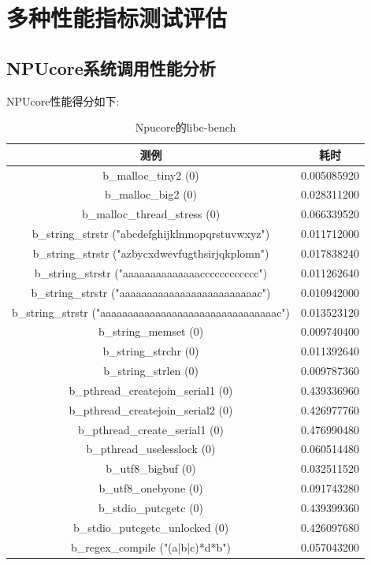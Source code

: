 \section{多种性能指标测试评估}

\subsection{NPUcore系统调用性能分析}

NPUcore性能得分如下:

\begin{table}
    \centering
    \begin{tabular}{|c|c|}
        \hline
        测例 & 耗时 \\
        \hline
        b\_malloc\_tiny2 (0) & 0.005085920 \\
        \hline
        b\_malloc\_big2 (0) & 0.028311200 \\
        \hline
        b\_malloc\_thread\_stress (0) & 0.066339520 \\
        \hline
        b\_string\_strstr ("abcdefghijklmnopqrstuvwxyz") & 0.011712000 \\
        \hline
        b\_string\_strstr ("azbycxdwevfugthsirjqkplomn") & 0.017838240 \\
        \hline
        b\_string\_strstr ("aaaaaaaaaaaaaacccccccccccc") & 0.011262640 \\
        \hline
        b\_string\_strstr ("aaaaaaaaaaaaaaaaaaaaaaaaac") & 0.010942000 \\
        \hline
        b\_string\_strstr ("aaaaaaaaaaaaaaaaaaaaaaaaaaaaaaaac") & 0.013523120 \\
        \hline
        b\_string\_memset (0) & 0.009740400 \\
        \hline
        b\_string\_strchr (0) & 0.011392640 \\
        \hline
        b\_string\_strlen (0) & 0.009787360 \\
        \hline
        b\_pthread\_createjoin\_serial1 (0) & 0.439336960 \\
        \hline
        b\_pthread\_createjoin\_serial2 (0) & 0.426977760 \\
        \hline
        b\_pthread\_create\_serial1 (0) & 0.476990480 \\
        \hline
        b\_pthread\_uselesslock (0) & 0.060514480 \\
        \hline
        b\_utf8\_bigbuf (0) & 0.032511520 \\
        \hline
        b\_utf8\_onebyone (0) & 0.091743280 \\
        \hline
        b\_stdio\_putcgetc (0) & 0.439399360 \\
        \hline
        b\_stdio\_putcgetc\_unlocked (0) & 0.426097680 \\
        \hline
        b\_regex\_compile ("(a|b|c)*d*b") & 0.057043200 \\
        \hline
    \end{tabular}
    \caption{Npucore的libc-bench}
\end{table}

